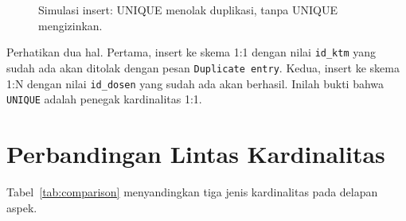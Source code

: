 \documentclass[11pt,a4paper]{article}
\begin{document}
\begin{figure}[H]
	\centering
	\caption{Simulasi insert: UNIQUE menolak duplikasi, tanpa UNIQUE mengizinkan.}
	\label{fig:simul}
\end{figure}

Perhatikan dua hal. Pertama, insert ke skema 1:1 dengan nilai \texttt{id\_ktm} yang sudah ada akan ditolak dengan pesan \texttt{Duplicate entry}. Kedua, insert ke skema 1:N dengan nilai \texttt{id\_dosen} yang sudah ada akan berhasil. Inilah bukti bahwa \texttt{UNIQUE} adalah penegak kardinalitas 1:1.

\section{Perbandingan Lintas Kardinalitas}

Tabel~\ref{tab:comparison} menyandingkan tiga jenis kardinalitas pada delapan aspek.
\end{document}
